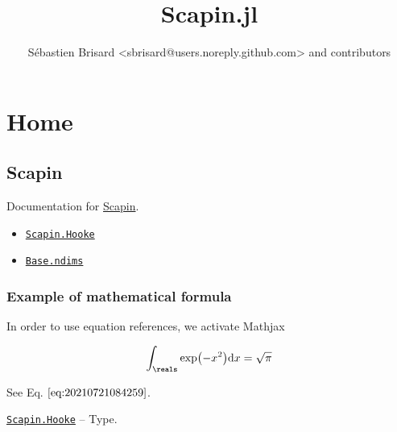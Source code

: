\documentclass[oneside]{memoir}
\title{
    {\HUGE Scapin.jl}\\
    {\Large }
}
\author{Sébastien Brisard <sbrisard@users.noreply.github.com> and contributors}
\begin{document}
\frontmatter
\maketitle
\clearpage
\tableofcontents

\mainmatter



\part{Home}




\hypertarget{4654847035117066990}{}


\chapter{Scapin}



Documentation for \href{https://github.com/sbrisard/Scapin.jl}{Scapin}.


\begin{itemize}
\item \hyperlink{8158906180689097333}{\texttt{Scapin.Hooke}}
\item \hyperlink{1841776622355285319}{\texttt{Base.ndims}}
\end{itemize}


\hypertarget{1429156231286803221}{}


\section{Example of mathematical formula}



In order to use equation references, we activate Mathjax



\begin{equation*}
\begin{split}\begin{equation}
\label{eq:20210721084259}
\int_\reals\exp\bigl(-x^2\bigr)\mathrm{d} x=\sqrt{\pi}
\end{equation}\end{split}\end{equation*}


See Eq. \(\eqref{eq:20210721084259}\).


\hypertarget{8158906180689097333}{} 
\hyperlink{8158906180689097333}{\texttt{Scapin.Hooke}}  -- {Type.}
\end{document}
